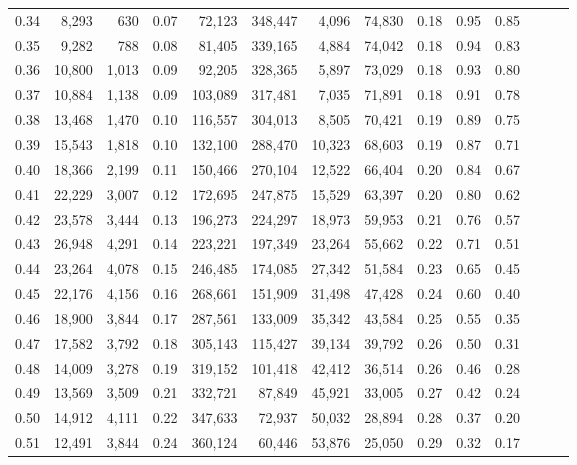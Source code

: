 \begin{tabular}{rrrrrrrrrrrrrr}
0.34 &   8,293 &    630 &  0.07 &   72,123 &  348,447 &   4,096 &  74,830 &  0.18 &  0.95 &      0.85 \\
0.35 &   9,282 &    788 &  0.08 &   81,405 &  339,165 &   4,884 &  74,042 &  0.18 &  0.94 &      0.83 \\
0.36 &  10,800 &  1,013 &  0.09 &   92,205 &  328,365 &   5,897 &  73,029 &  0.18 &  0.93 &      0.80 \\
0.37 &  10,884 &  1,138 &  0.09 &  103,089 &  317,481 &   7,035 &  71,891 &  0.18 &  0.91 &      0.78 \\
0.38 &  13,468 &  1,470 &  0.10 &  116,557 &  304,013 &   8,505 &  70,421 &  0.19 &  0.89 &      0.75 \\
0.39 &  15,543 &  1,818 &  0.10 &  132,100 &  288,470 &  10,323 &  68,603 &  0.19 &  0.87 &      0.71 \\
0.40 &  18,366 &  2,199 &  0.11 &  150,466 &  270,104 &  12,522 &  66,404 &  0.20 &  0.84 &      0.67 \\
0.41 &  22,229 &  3,007 &  0.12 &  172,695 &  247,875 &  15,529 &  63,397 &  0.20 &  0.80 &      0.62 \\
0.42 &  23,578 &  3,444 &  0.13 &  196,273 &  224,297 &  18,973 &  59,953 &  0.21 &  0.76 &      0.57 \\
0.43 &  26,948 &  4,291 &  0.14 &  223,221 &  197,349 &  23,264 &  55,662 &  0.22 &  0.71 &      0.51 \\
0.44 &  23,264 &  4,078 &  0.15 &  246,485 &  174,085 &  27,342 &  51,584 &  0.23 &  0.65 &      0.45 \\
0.45 &  22,176 &  4,156 &  0.16 &  268,661 &  151,909 &  31,498 &  47,428 &  0.24 &  0.60 &      0.40 \\
0.46 &  18,900 &  3,844 &  0.17 &  287,561 &  133,009 &  35,342 &  43,584 &  0.25 &  0.55 &      0.35 \\
0.47 &  17,582 &  3,792 &  0.18 &  305,143 &  115,427 &  39,134 &  39,792 &  0.26 &  0.50 &      0.31 \\
0.48 &  14,009 &  3,278 &  0.19 &  319,152 &  101,418 &  42,412 &  36,514 &  0.26 &  0.46 &      0.28 \\
0.49 &  13,569 &  3,509 &  0.21 &  332,721 &   87,849 &  45,921 &  33,005 &  0.27 &  0.42 &      0.24 \\
0.50 &  14,912 &  4,111 &  0.22 &  347,633 &   72,937 &  50,032 &  28,894 &  0.28 &  0.37 &      0.20 \\
0.51 &  12,491 &  3,844 &  0.24 &  360,124 &   60,446 &  53,876 &  25,050 &  0.29 &  0.32 &      0.17 \\

\end{tabular}
